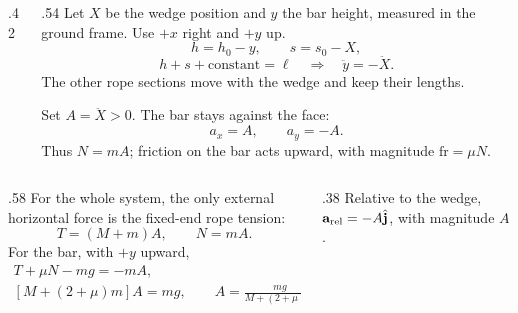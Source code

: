 \begin{solutionframe}
  \begin{columns}[T,onlytextwidth]
    \begin{column}{.42\textwidth}
    \end{column}
    \begin{column}{.54\textwidth}
      Let \(X\) be the wedge position and \(y\) the bar height,
      measured in the ground frame. Use \(+x\) right and \(+y\) up.
      \[
        h=h_0-y,\qquad s=s_0-X,
      \]
      \[
        h+s+\text{constant}=\ell
        \quad\Rightarrow\quad \ddot y=-\ddot X.
      \]
      The other rope sections move with the wedge and keep their lengths.

      \medskip
      Set \(A=\ddot X>0\). The bar stays against the face:
      \[
        a_x=A,\qquad a_y=-A.
      \]
      Thus \(N=mA\); friction on the bar acts upward,
      with magnitude \(\mathrm{fr}=\mu N\).
    \end{column}
  \end{columns}
\end{solutionframe}

\begin{solutionframe}
  \begin{columns}[T,onlytextwidth]
    \begin{column}{.58\textwidth}
      For the whole system, the only external horizontal force is the
      fixed-end rope tension:
      \[
        T=(M+m)A,\qquad N=mA.
      \]
      For the bar, with \(+y\) upward,
      \[
        \begin{gathered}
          T+\mu N-mg=-mA,\\[.4em]
          [M+(2+\mu)m]A=mg,\qquad
          A=\frac{mg}{M+(2+\mu)m}.
        \end{gathered}
      \]
    \end{column}
    \begin{column}{.38\textwidth}
      \medskip
      Relative to the wedge,
      \(\mathbf a_{\rm rel}=-A\hat{\mathbf j}\), with magnitude \(A\).
    \end{column}
  \end{columns}
\end{solutionframe}


